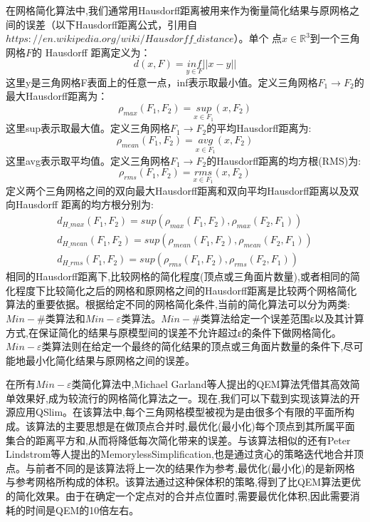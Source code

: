 在网格简化算法中,我们通常用Hausdorff距离被用来作为衡量简化结果与原网格之间的误差（以下Hausdorff距离公式，引用自$https://en.wikipedia.org/wiki/Hausdorff\_distance$）。单个
点$x\in\mathbb{R}^3$到一个三角网格$F$的 Hausdorff 距离定义为：
\begin{equation}
d(x, F) = \underset{y\in F}{inf}||x-y||
\end{equation}
这里y是三角网格F表面上的任意一点，inf表示取最小值。定义三角网格$F_1 \to F_2$的最大Hausdorff距离为：
\begin{equation}
  \rho_{max}(F_1,F_2)=\underset{x\in F_1}{sup}(x,F_2)
\end{equation}
这里sup表示取最大值。定义三角网格$F_1 \to F_2$的平均Hausdorff距离为:
\begin{equation}
  \rho_{mean}(F_1,F_2)=\underset{x\in F_1}{avg}(x,F_2)
\end{equation}
这里avg表示取平均值。定义三角网格$F_1 \to F_2$的Hausdorff距离的均方根(RMS)为:
\begin{equation}
  \rho_{rms}(F_1,F_2)=\underset{x\in F_1}{rms}(x,F_2)
\end{equation}
定义两个三角网格之间的双向最大Hausdorff距离和双向平均Hausdorff距离以及双向Hausdorff 距离的均方根分别为:
\begin{equation}
  \begin{array}{l}
    d_{H\_max}(F_1,F_2)=sup(\rho_{max}(F_1,F_2), \rho_{max}(F_2,F_1))\\
    d_{H\_mean}(F_1,F_2)=sup(\rho_{mean}(F_1,F_2), \rho_{mean}(F_2,F_1))\\
    d_{H\_rms}(F_1,F_2)=sup(\rho_{rms}(F_1,F_2), \rho_{rms}(F_2,F_1))
  \end{array}
\end{equation}
相同的Hausdorff距离下,比较网格的简化程度(顶点或三角面片数量),或者相同的简化程度下比较简化之后的网格和原网格之间的Hausdorff距离是比较两个网格简化算法的重要依据。根据给定不同的网格简化条件,当前的简化算法可以分为两类:$Min−\#$类算法和$Min−\varepsilon$类算法。$Min−\#$类算法给定一个误差范围ε以及其计算方式,在保证简化的结果与原模型间的误差不允许超过ε的条件下做网格简化。$Min−\varepsilon$类算法则在给定一个最终的简化结果的顶点或三角面片数量的条件下,尽可能地最小化简化结果与原网格之间的误差。\par
在所有$Min−\varepsilon$类简化算法中,Michael Garland等人提出的QEM算法\cite{qem}凭借其高效简单效果好,成为较流行的网格简化算法之一。现在,我们可以下载到实现该算法的开源应用QSlim。在该算法中,每个三角网格模型被视为是由很多个有限的平面所构成。该算法的主要思想是在做顶点合并时,最优化(最小化)每个顶点到其所属平面集合的距离平方和,从而将降低每次简化带来的误差。与该算法相似的还有Peter Lindstrom等人提出的MemorylessSimplification,也是通过贪心的策略迭代地合并顶点。与前者不同的是该算法将上一次的结果作为参考,最优化(最小化)的是新网格与参考网格所构成的体积。该算法通过这种保体积的策略,得到了比QEM算法更优的简化效果。由于在确定一个定点对的合并点位置时,需要最优化体积,因此需要消耗的时间是QEM的10倍左右。\par
